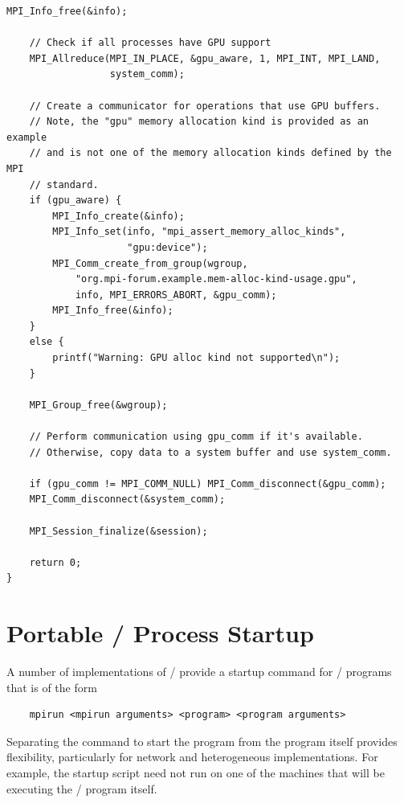\begin{example}
\begin{lstlisting}[language={[MPI]C}]
    MPI_Info_free(&info);

    // Check if all processes have GPU support
    MPI_Allreduce(MPI_IN_PLACE, &gpu_aware, 1, MPI_INT, MPI_LAND,
                  system_comm);

    // Create a communicator for operations that use GPU buffers.
    // Note, the "gpu" memory allocation kind is provided as an example
    // and is not one of the memory allocation kinds defined by the MPI
    // standard.
    if (gpu_aware) {
        MPI_Info_create(&info);
        MPI_Info_set(info, "mpi_assert_memory_alloc_kinds",
                     "gpu:device");
        MPI_Comm_create_from_group(wgroup,
            "org.mpi-forum.example.mem-alloc-kind-usage.gpu",
            info, MPI_ERRORS_ABORT, &gpu_comm);
        MPI_Info_free(&info);
    }
    else {
        printf("Warning: GPU alloc kind not supported\n");
    }

    MPI_Group_free(&wgroup);

    // Perform communication using gpu_comm if it's available.
    // Otherwise, copy data to a system buffer and use system_comm.

    if (gpu_comm != MPI_COMM_NULL) MPI_Comm_disconnect(&gpu_comm);
    MPI_Comm_disconnect(&system_comm);

    MPI_Session_finalize(&session);

    return 0;
}
\end{lstlisting}
\end{example}

\section{Portable \texorpdfstring{\MPI/}{MPI} Process Startup}
\label{sec:inquiry-mpiexec}

A number of implementations of \mpi/ provide a startup command for \MPI/ programs
that is of the form
%
\begin{verbatim}
    mpirun <mpirun arguments> <program> <program arguments>
\end{verbatim}
Separating the command to start the program from the program itself provides
flexibility, particularly for network and heterogeneous implementations.  For
example, the startup script need not run on one of the machines that will be
executing the \MPI/ program itself.


